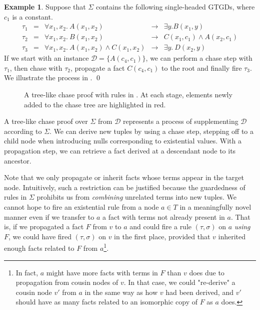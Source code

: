 \documentclass[12pt]{report}
\theoremstyle{plain}
\theoremstyle{definition}
\newtheorem{example}[theorem]{Example}
\begin{document}
\begin{example}
\label{tree-like-chase-proof-example}
  Suppose that $\Sigma$ contains the following single-headed GTGDs, where $c_1$ is a constant.
  \[\begin{array}{rcrcl}
    \tau_1 &=& \forall x_1,x_2.\ A(x_1, x_2) &\rightarrow& \exists y. B(x_1, y) \\
    \tau_2 &=& \forall x_1,x_2.\ B(x_1, x_2) &\rightarrow& C(x_1, c_1) \wedge A(x_2, c_1) \\
    \tau_3 &=& \forall x_1,x_2.\ A(x_1, x_2) \wedge C(x_1, x_2) &\rightarrow& \exists y.\ D(x_2, y)
  \end{array}\]
  If we start with an instance $\mathcal{D} = \{A(c_4, c_1)\}$, we can perform a chase step with $\tau_1$, then chase with $\tau_2$, propagate a fact $C(c_4, c_1)$ to the root and finally fire $\tau_3$. We illustrate the process in .
  \qed
\end{example}

\begin{figure}[t]
  \centering
  
  \caption{A tree-like chase proof with rules in . At each stage, elements newly added to the chase tree are highlighted in red.}
  \label{tree-like-chase-proof-example-diagram}
\end{figure}

A tree-like chase proof over $\Sigma$ from $\mathcal{D}$ represents a process of supplementing $\mathcal{D}$ according to $\Sigma$. We can derive new tuples by using a chase step, stepping off to a child node when introducing nulls corresponding to existential values. With a propagation step, we can retrieve a fact derived at a descendant node to its ancestor.

Note that we only propagate or inherit facts whose terms appear in the target node. Intuitively, such a restriction can be justified because the guardedness of rules in $\Sigma$ prohibits us from \emph{combining} unrelated terms into new tuples. We cannot hope to fire an existential rule from a node $a \in T$ in a meaningfully novel manner even if we transfer to $a$ a fact with terms not already present in $a$. That is, if we propagated a fact $F$ from $v$ to $a$ and could fire a rule $(\tau, \sigma)$ on $a$ \emph{using} $F$, we could have fired $(\tau, \sigma)$ on $v$ in the first place, provided that $v$ inherited enough facts related to $F$ from $a$\footnote{In fact, $a$ might have more facts with terms in $F$ than $v$ does due to propagation from cousin nodes of $v$. In that case, we could "re-derive" a cousin node $v'$ from $a$ in the same way as how $v$ had been derived, and $v'$ should have as many facts related to an isomorphic copy of $F$ as $a$ does.}.
\end{document}
